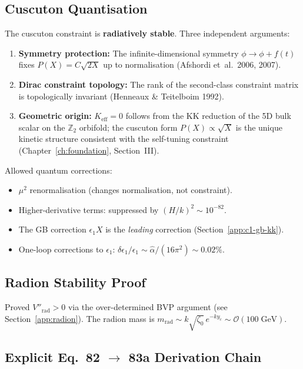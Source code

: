 \subsection{Cuscuton Quantisation}

The cuscuton constraint is \textbf{radiatively stable}. Three independent arguments:
\begin{enumerate}
\item \textbf{Symmetry protection:} The infinite-dimensional symmetry $\phi \to \phi + f(t)$ fixes $P(X) = C\sqrt{2X}$ up to normalisation (Afshordi et~al.\ 2006, 2007).
\item \textbf{Dirac constraint topology:} The rank of the second-class constraint matrix is topologically invariant (Henneaux \& Teitelboim 1992).
\item \textbf{Geometric origin:} $K_{\mathrm{eff}} = 0$ follows from the KK reduction of the 5D bulk scalar on the $\mathbb{Z}_2$ orbifold; the cuscuton form $P(X) \propto \sqrt{X}$ is the unique kinetic structure consistent with the self-tuning constraint (Chapter~\ref{ch:foundation}, Section~III).
\end{enumerate}

Allowed quantum corrections:
\begin{itemize}
\item $\mu^2$ renormalisation (changes normalisation, not constraint).
\item Higher-derivative terms: suppressed by $(H/k)^2 \sim 10^{-82}$.
\item The GB correction $\epsilon_1 X$ is the \emph{leading} correction (Section~\ref{app:c1-gb-kk}).
\item One-loop corrections to $\epsilon_1$: $\delta\epsilon_1/\epsilon_1 \sim \hat{\alpha}/(16\pi^2) \sim 0.02\%$.
\end{itemize}

\subsection{Radion Stability Proof}

Proved $V''_{\mathrm{rad}} > 0$ via the over-determined BVP argument (see Section~\ref{app:radion}). The radion mass is $m_{\mathrm{rad}} \sim k\sqrt{\zeta_0}\,e^{-ky_c} \sim \mathcal{O}(100\;\mathrm{GeV})$.

\subsection{Explicit Eq.~82 $\to$ 83a Derivation Chain}

